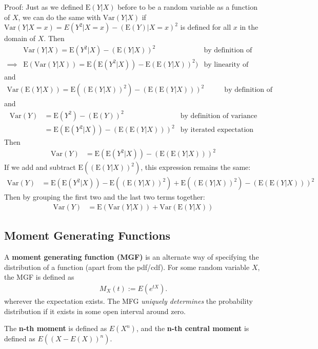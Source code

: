 \documentclass[a4paper,10pt]{article}
\newcommand{\E}{\mathrm{E}}
\newcommand{\Var}{\mathrm{Var}}
\begin{document}
Proof: Just as we defined $\E(Y|X)$ before to be a random variable as a function of $X$, we can do the same with $\Var(Y|X)$ if $\Var(Y|X=x) = E(Y^2|X=x) - (\E(Y)|X=x)^2$ is defined for all $x$ in the domain of $X$. Then 
\begin{align*}
    &\Var(Y|X) = \E(Y^2|X) - (\E(Y|X))^2 &\text{by definition of variance} \\
    \implies &\E(\Var(Y|X)) = \E(\E(Y^2|X)) - \E(\E(Y|X))^2) &\text{by linearity of expectation}
\end{align*}
and 
\begin{align*}
    \Var(\E(Y|X)) = \E((\E(Y|X))^2) - (\E(\E(Y|X)))^2 &\qquad\text{by definition of variance}
\end{align*}
and 
\begin{align*}
    \Var(Y) &= \E(Y^2) - (\E(Y))^2 &\text{by definition of variance} \\ 
    &= \E(\E(Y^2|X)) - (\E(\E(Y|X)))^2 &\text{by iterated expectation}
\end{align*}
Then 
\begin{align*}
    \Var(Y) &= \E(\E(Y^2|X)) - (\E(\E(Y|X)))^2
\end{align*}
If we add and subtract $\E((\E(Y|X))^2)$, this expression remains the same:
\begin{align*}
    \Var(Y) &= \E(\E(Y^2|X)) - \E((\E(Y|X))^2) + \E((\E(Y|X))^2) - (\E(\E(Y|X)))^2
\end{align*}
Then by grouping the first two and the last two terms together:
\begin{align*}
    \Var(Y) &= \E(\Var(Y|X)) + \Var(\E(Y|X))
\end{align*}



\subsection{Moment Generating Functions}

A \textbf{moment generating function (MGF)} is an alternate way of specifying the distribution of a function (apart from the pdf/cdf). For some random variable $X$, the MGF is defined as 
\begin{align*}
    M_X(t) := E(e^{tX}).
\end{align*}
wherever the expectation exists. The MFG \textit{uniquely determines} the probability distribution if it exists in some open interval around zero. 

The \textbf{n-th moment} is defined as $E(X^n)$, and the \textbf{n-th central moment} is defined as $E\left(\left(X-E(X)\right)^n\right)$.
\end{document}

